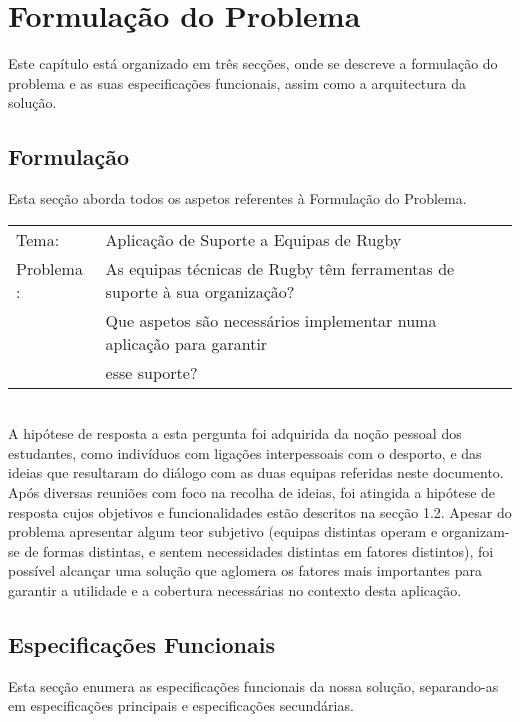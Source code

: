 %
%
%
\chapter{Formulação do Problema} \label{cap:formulacao}

Este capítulo está organizado em três secções, onde se descreve a formulação do problema e as suas especificações funcionais, assim como a arquitectura da solução.\\

\section{Formulação}\label{sec21}
Esta secção aborda todos os aspetos referentes à Formulação do Problema.\\

\begin{tabular}{ll}
	Tema: & Aplicação de Suporte a Equipas de Rugby \\
	Problema : & As equipas técnicas de Rugby têm ferramentas de suporte à sua organização? \\
		&	Que aspetos são necessários implementar numa aplicação para garantir \\
		&	esse suporte?\\
\end{tabular}\\[10mm]
A hipótese de resposta a esta pergunta foi adquirida da noção pessoal dos estudantes, como indivíduos com ligações interpessoais com o desporto, e das ideias que resultaram do diálogo com as duas equipas referidas neste documento. Após diversas reuniões com foco na recolha de ideias, foi atingida a hipótese de resposta cujos objetivos e funcionalidades estão descritos na secção 1.2. Apesar do problema apresentar algum teor subjetivo (equipas distintas operam e organizam-se de formas distintas, e sentem necessidades distintas em fatores distintos), foi possível alcançar uma solução que aglomera os fatores mais importantes para garantir a utilidade e a cobertura necessárias no contexto desta aplicação.

\section{Especificações Funcionais}\label{sec22}
Esta secção enumera as especificações funcionais da nossa solução, separando-as em especificações principais e especificações secundárias.

